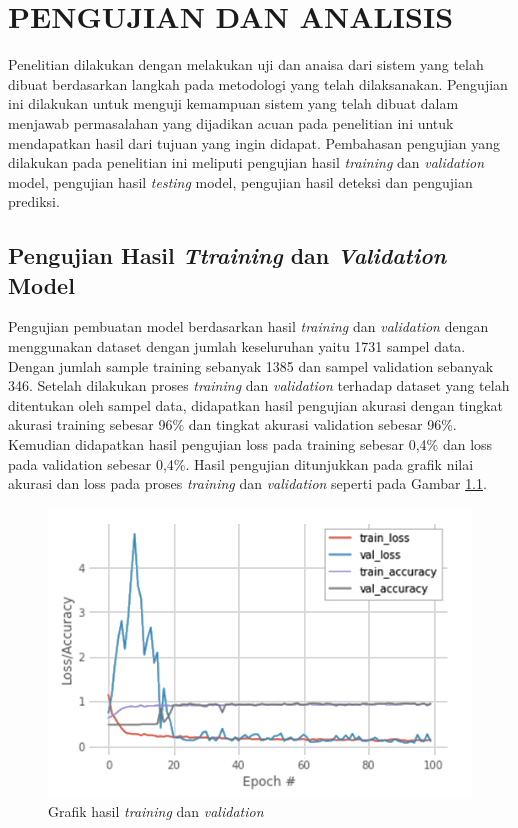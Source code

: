 \chapter{PENGUJIAN DAN ANALISIS}
\label{chap:pengujiananalisis}


Penelitian dilakukan dengan melakukan uji dan anaisa dari sistem yang telah dibuat berdasarkan langkah pada metodologi yang telah dilaksanakan. Pengujian ini dilakukan untuk menguji kemampuan sistem yang telah dibuat dalam menjawab permasalahan yang dijadikan acuan pada penelitian ini untuk mendapatkan hasil dari tujuan yang ingin didapat. Pembahasan pengujian yang dilakukan pada penelitian ini meliputi pengujian hasil \emph{training} dan \emph{validation} model, pengujian hasil \emph{testing} model, pengujian hasil deteksi dan pengujian prediksi.

\section{Pengujian Hasil \emph{Ttraining} dan \emph{Validation} Model}
\label{sec:PengujianTrainingValidation}

Pengujian pembuatan model berdasarkan hasil \emph{training} dan \emph{validation} dengan menggunakan dataset dengan jumlah keseluruhan yaitu 1731 sampel data. Dengan jumlah sample training sebanyak 1385 dan sampel validation sebanyak 346. Setelah dilakukan proses \emph{training} dan \emph{validation} terhadap dataset yang telah ditentukan oleh sampel data, didapatkan hasil pengujian akurasi dengan tingkat akurasi training sebesar 96\% dan tingkat akurasi validation sebesar 96\%. Kemudian didapatkan hasil pengujian loss pada training sebesar 0,4\% dan loss pada validation sebesar 0,4\%. Hasil pengujian ditunjukkan pada grafik nilai akurasi dan loss pada proses \emph{training} dan \emph{validation} seperti pada Gambar \ref{fig:HasilTrainingValidation}.

\begin{figure}[H]
  \centering
  \includegraphics[scale=0.65]{gambar/hasil training dan validation w.jpg}
  \caption{Grafik hasil \emph{training} dan \emph{validation}}
  \label{fig:HasilTrainingValidation}
\end{figure}


